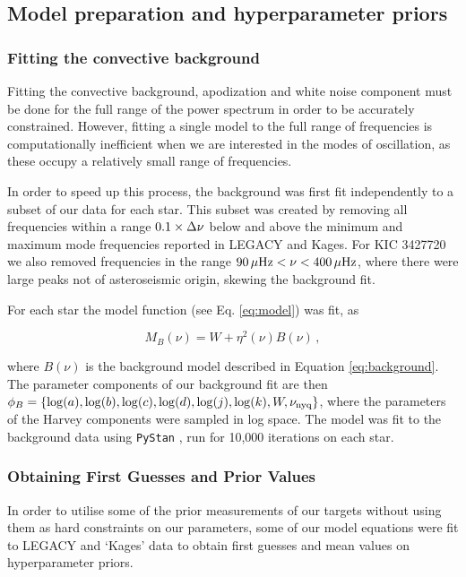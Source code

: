 \subsection{Model preparation and hyperparameter priors}
\subsubsection{Fitting the convective background}\label{sec:background}
Fitting the convective background, apodization and white noise component must be done for the full range of the power spectrum in order to be accurately constrained. However, fitting a single model to the full range of frequencies is computationally inefficient when we are interested in the modes of oscillation, as these occupy a relatively small range of frequencies.

In order to speed up this process, the background was first fit independently to a subset of our data for each star. This subset was created by removing all frequencies within a range $0.1 \times \mbox{$\Delta \nu$}$ below and above the minimum and maximum mode frequencies reported in LEGACY and Kages. For KIC 3427720 we also removed frequencies in the range $90\, \mu\rm{Hz} < \nu < 400\, \mu{\rm{Hz}}$, where there were large peaks not of asteroseismic origin, skewing the background fit.

For each star the model function (see Eq. \ref{eq:model}) was fit, as

\begin{equation}
	M_{B}(\nu) = W + \eta^2(\nu)B(\nu)\, ,
\end{equation}

\noindent where $B(\nu)$ is the background model described in Equation \ref{eq:background}. The parameter components of our background fit are then $\phi_B = \{\log(a), \log(b), \log(c), \log(d), \log(j), \log(k), W, \nu_{\rm nyq}\}$, where the parameters of the Harvey components were sampled in log space. The model was fit to the background data using \texttt{PyStan} \cite{vanhoey+2013}, run for 10,000 iterations on each star. 

\subsubsection{Obtaining First Guesses and Prior Values}
In order to utilise some of the prior measurements of our targets without using them as hard constraints on our parameters, some of our model equations were fit to LEGACY and `Kages' data to obtain first guesses and mean values on hyperparameter priors.


